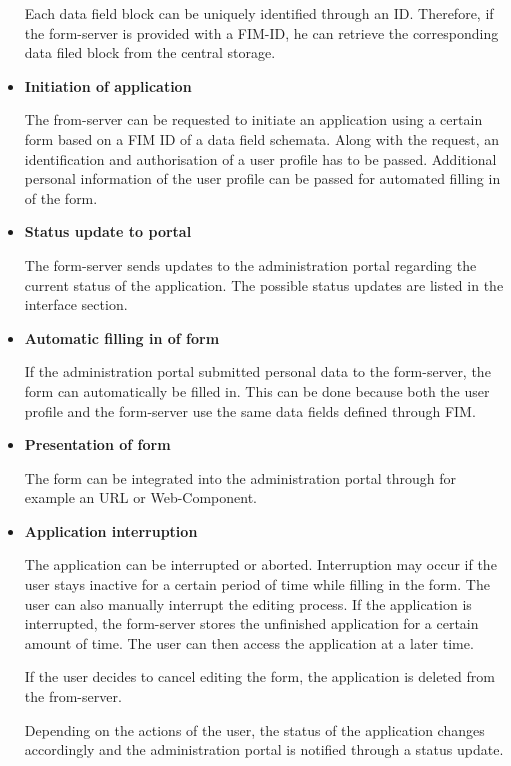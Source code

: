 \documentclass[
     12pt,         %
     a4paper,      %
     BCOR=10mm,version=first,     %
     DIV=14,version=first,        %
     ]{scrreprt}
\begin{document}
\begin{itemize}
    Each data field block can be uniquely identified through an ID. Therefore, if the form-server is provided with a FIM-ID, he can retrieve the corresponding data filed block from the central storage.
    
    \item \textbf{Initiation of application}
    
    The from-server can be requested to initiate an application using a certain form based on a FIM ID of a data field schemata. Along with the request, an identification and authorisation of a user profile has to be passed. Additional personal information of the user profile can be passed for automated filling in of the form.
    
    \item \textbf{Status update to portal}
    
    The form-server sends updates to the administration portal regarding the current status of the application. The possible status updates are listed in the interface section.

    \item \textbf{Automatic filling in of form}
    
    If the administration portal submitted personal data to the form-server, the form can automatically be filled in. This can be done because both the user profile and the form-server use the same data fields defined through FIM.
    
    \item \textbf{Presentation of form}
    
    The form can be integrated into the administration portal through for example an URL or Web-Component.
    
    \item \textbf{Application interruption}
    
    The application can be interrupted or aborted. Interruption may occur if the user stays inactive for a certain period of time while filling in the form. The user can also manually interrupt the editing process. If the application is interrupted, the form-server stores the unfinished application for a certain amount of time. The user can then access the application at a later time.
    
    If the user decides to cancel editing the form, the application is deleted from the from-server.
    
    Depending on the actions of the user, the status of the application changes accordingly and the administration portal is notified through a status update.
    

\end{itemize}
\end{document}
